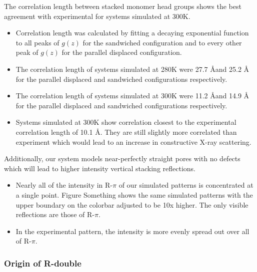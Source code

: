 \documentclass{article}
\begin{document}
  The correlation length between stacked monomer head groups shows the best agreement with
  experimental for systems simulated at 300K.
  \begin{itemize}
  		\item Correlation length was calculated by fitting a decaying exponential function
  		to all peaks of $g(z)$ for the sandwiched configuration and to every other peak of
  		$g(z)$ for the parallel displaced configuration. 
  		\item The correlation length of systems simulated at 280K were 27.7 \AA and 25.2 \AA
  		for the parallel displaced and sandwiched configurations respectively. 
  		\item The correlation length of systems simulated at 300K were 11.2 \AA and 14.9 \AA
  		for the parallel displaced and sandwiched configurations respectively. 
  		\item Systems simulated at 300K show correlation closest to the experimental 
  		correlation length of 10.1 \AA. They are still slightly more correlated than 
  		experiment which would lead to an increase in constructive X-ray scattering. 
  \end{itemize}
  
  Additionally, our system models near-perfectly straight pores with no defects which will
  lead to higher intensity vertical stacking reflections. 
  \begin{itemize}
  		\item Nearly all of the intensity in R-$\pi$ of our simulated patterns is concentrated
  		at a single point. Figure Something shows the same simulated patterns with the upper 
  		boundary on the colorbar adjusted to be 10x higher. The only visible reflections are
  		those of R-$\pi$.
  		\item In the experimental pattern, the intensity is more evenly spread out over all
  		of R-$\pi$. 
  \end{itemize}
  
  \subsubsection{Origin of R-double}\label{section:rdouble}
  
\end{document}
